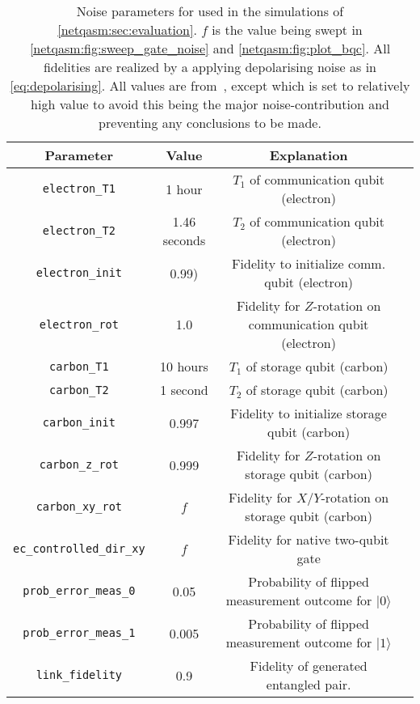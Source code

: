 \begin{table}
  \centering
  \begin{tabular}{||c|c|c|c||}
    \hline
    Parameter                 & Value        & Explanation                                                 \\
    \hline\hline
    \texttt{electron\_T1}          & 1 hour       & $T_1$ of communication qubit (electron)                     \\
    \texttt{electron\_T2}          & 1.46 seconds & $T_2$ of communication qubit (electron)                     \\
    \texttt{electron\_init}        & 0.99)        & Fidelity to initialize comm. qubit (electron)       \\
    \texttt{electron\_rot}         & 1.0          & \makecell{Fidelity for $Z$-rotation on \\ communication qubit (electron)} \\
    \texttt{carbon\_T1}            & 10 hours     & $T_1$ of storage qubit (carbon)                             \\
    \texttt{carbon\_T2}            & 1 second     & $T_2$ of storage qubit (carbon)                             \\
    \texttt{carbon\_init}          & 0.997        & Fidelity to initialize storage qubit (carbon)               \\
    \texttt{carbon\_z\_rot}         & 0.999        & \makecell{Fidelity for $Z$-rotation on \\ storage qubit (carbon)}         \\
    \texttt{carbon\_xy\_rot}        & $f$          & \makecell{Fidelity for $X$/$Y$-rotation on \\ storage qubit (carbon)}     \\
    \texttt{ec\_controlled\_dir\_xy} & $f$          & Fidelity for native two-qubit gate                          \\
    \texttt{prob\_error\_meas\_0}    & 0.05         & \makecell{Probability of flipped measurement \\ outcome for $|0\rangle$}  \\
    \texttt{prob\_error\_meas\_1}    & 0.005        & \makecell{Probability of flipped measurement \\ outcome for $|1\rangle$}  \\
    \texttt{link\_fidelity}        & 0.9          & Fidelity of generated entangled pair.                       \\
    \hline
  \end{tabular}
  \caption{
    Noise parameters for used in the simulations of \cref{netqasm:sec:evaluation}.
    $f$ is the value being swept in \cref{netqasm:fig:sweep_gate_noise} and \cref{netqasm:fig:plot_bqc}.
    All fidelities are realized by a applying depolarising noise as in \cref{eq:depolarising}.
    All values are from~\cite{coopmans2021netsquid}, except  which is set to relatively high value to avoid this being the major noise-contribution and preventing any conclusions to be made.
  }
  \label{tab:noise}
\end{table}

